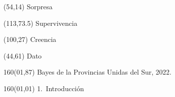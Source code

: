 \documentclass[shownotes,aspectratio=169]{beamer}
\begin{document}
\color{black!85}
\large

\begin{frame}
\begin{textblock}{80}(54,14)
 \huge \textcolor{black!50}{Sorpresa}
\end{textblock}

\begin{textblock}{47}(113,73.5)
\centering \LARGE  \textcolor{black!5}{Supervivencia}
\end{textblock}

\begin{textblock}{80}(100,27)
\LARGE  \textcolor{black!10}{Creencia}
\end{textblock}

\begin{textblock}{80}(44,61)
\LARGE  \textcolor{black!15}{Dato}
\end{textblock}

\begin{textblock}{160}(01,87)
\scriptsize \textcolor{black!5}{Bayes de la Provincias Unidas del Sur, 2022.}
\end{textblock}

\begin{textblock}{160}(01,01)
\normalsize \textcolor{black!60}{1.\ Introducción}
\end{textblock}


{}
\end{frame}
\end{document}
